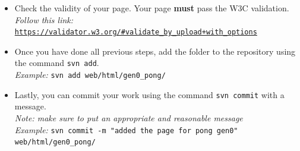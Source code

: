 \documentclass{article}
\begin{document}
\begin{itemize}
    \item Check the validity of your page. Your page \textbf{must} pass the \colorbox{grey!7}{W3C validation}. \\
    \textit{Follow this link:} \texttt{\href{https://validator.w3.org/#validate_by_upload+with_options}{https://validator.w3.org/\#validate\_by\_upload+with\_options}}
    
    \item Once you have done all previous steps, add the folder to the repository using the command \colorbox{grey!7}{\texttt{svn add}}.\\
    \textit{Example:} \texttt{svn add web/html/gen0\_pong/}
    
    \item Lastly, you can commit your work using the command \colorbox{grey!7}{\texttt{svn commit}} with a message. \\
    \textit{Note: make sure to put an appropriate and reasonable message} \\
    \textit{Example:} \texttt{svn commit -m "added the page for pong gen0" web/html/gen0\_pong/}
    
\end{itemize}
\end{document}
